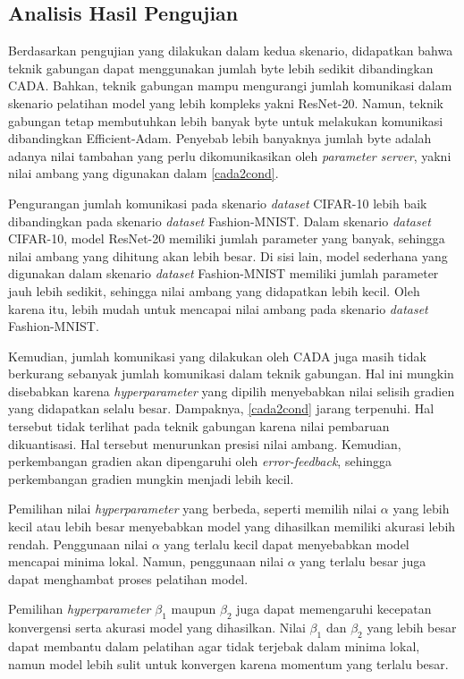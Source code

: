 \subsection{Analisis Hasil Pengujian}

Berdasarkan pengujian yang dilakukan dalam kedua skenario, didapatkan bahwa teknik gabungan dapat menggunakan jumlah byte lebih sedikit dibandingkan CADA. Bahkan, teknik gabungan mampu mengurangi jumlah komunikasi dalam skenario pelatihan model yang lebih kompleks yakni ResNet-20. Namun, teknik gabungan tetap membutuhkan lebih banyak byte untuk melakukan komunikasi dibandingkan Efficient-Adam. Penyebab lebih banyaknya jumlah byte adalah adanya nilai tambahan yang perlu dikomunikasikan oleh \emph{parameter server}, yakni nilai ambang yang digunakan dalam \autoref{cada2cond}.

Pengurangan jumlah komunikasi pada skenario \emph{dataset} CIFAR-10 lebih baik dibandingkan pada skenario \emph{dataset} Fashion-MNIST. Dalam skenario \emph{dataset} CIFAR-10, model ResNet-20 memiliki jumlah parameter yang banyak, sehingga nilai ambang yang dihitung akan lebih besar. Di sisi lain, model sederhana yang digunakan dalam skenario \emph{dataset} Fashion-MNIST memiliki jumlah parameter jauh lebih sedikit, sehingga nilai ambang yang didapatkan lebih kecil. Oleh karena itu, lebih mudah untuk mencapai nilai ambang pada skenario \emph{dataset} Fashion-MNIST.

Kemudian, jumlah komunikasi yang dilakukan oleh CADA juga masih tidak berkurang sebanyak jumlah komunikasi dalam teknik gabungan. Hal ini mungkin disebabkan karena \emph{hyperparameter} yang dipilih menyebabkan nilai selisih gradien yang didapatkan selalu besar. Dampaknya, \autoref{cada2cond} jarang terpenuhi. Hal tersebut tidak terlihat pada teknik gabungan karena nilai pembaruan dikuantisasi. Hal tersebut menurunkan presisi nilai ambang. Kemudian, perkembangan gradien akan dipengaruhi oleh \emph{error-feedback}, sehingga perkembangan gradien mungkin menjadi lebih kecil.

Pemilihan nilai \emph{hyperparameter} yang berbeda, seperti memilih nilai $\alpha$ yang lebih kecil atau lebih besar menyebabkan model yang dihasilkan memiliki akurasi lebih rendah. Penggunaan nilai $\alpha$ yang terlalu kecil dapat menyebabkan model mencapai minima lokal. Namun, penggunaan nilai $\alpha$ yang terlalu besar juga dapat menghambat proses pelatihan model.

Pemilihan \emph{hyperparameter} $\beta_1$ maupun $\beta_2$ juga dapat memengaruhi kecepatan konvergensi serta akurasi model yang dihasilkan. Nilai $\beta_1$ dan $\beta_2$ yang lebih besar dapat membantu dalam pelatihan agar tidak terjebak dalam minima lokal, namun model lebih sulit untuk konvergen karena momentum yang terlalu besar.

